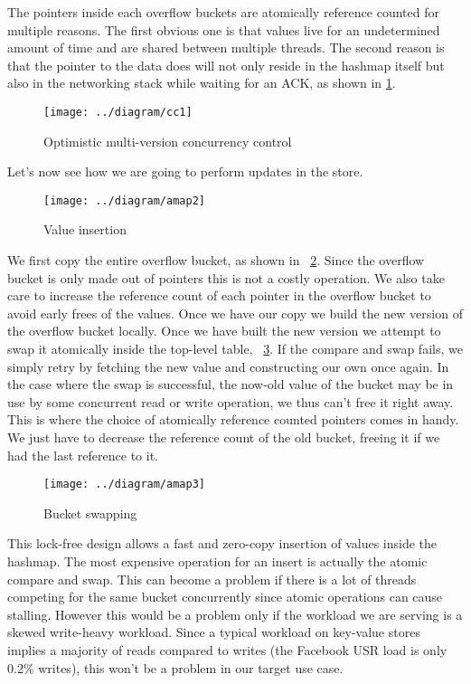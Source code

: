 \documentclass[11pt]{article}
\begin{document}
The pointers inside each overflow buckets are atomically reference
counted for multiple reasons. The first obvious one is that values
live for an undetermined amount of time and are shared between
multiple threads. The second reason is that the pointer to the data
does will not only reside in the hashmap itself but also in the
networking stack while waiting for an ACK, as shown in
\ref{fig:omvcc}.

\begin{figure}[h!]
  \texttt{[image: ../diagram/cc1]}
  \caption{Optimistic multi-version concurrency control}
  \label{fig:omvcc}
\end{figure}

Let's now see how we are going to perform updates in the store.

\begin{figure}[h!]
  \texttt{[image: ../diagram/amap2]}
  \caption{Value insertion}
  \label{fig:omvcc-insert}
\end{figure}

We first copy the entire overflow bucket, as shown in
~\ref{fig:omvcc-insert}. Since the overflow bucket is only made out of
pointers this is not a costly operation. We also take care to increase
the reference count of each pointer in the overflow bucket to avoid
early frees of the values. Once we have our copy we build the new
version of the overflow bucket locally. Once we have built the new
version we attempt to swap it atomically inside the top-level
table, ~\ref{fig:omvcc-swap}. If the compare and swap fails, we simply
retry by fetching the new value and constructing our own once
again. In the case where the swap is successful, the now-old value of
the bucket may be in use by some concurrent read or write operation,
we thus can't free it right away. This is where the choice of
atomically reference counted pointers comes in handy. We just have to
decrease the reference count of the old bucket, freeing it if we had
the last reference to it.

\begin{figure}
  \texttt{[image: ../diagram/amap3]}
  \caption{Bucket swapping}
  \label{fig:omvcc-swap}
\end{figure}

This lock-free design allows a fast and zero-copy insertion of values
inside the hashmap. The most expensive operation for an insert is
actually the atomic compare and swap. This can become a problem if
there is a lot of threads competing for the same bucket concurrently
since atomic operations can cause stalling. However this would be a
problem only if the workload we are serving is a skewed write-heavy
workload. Since a typical workload on key-value stores implies a
majority of reads compared to writes (the Facebook USR load is only
0.2\% writes), this won't be a problem in our target use case.
\end{document}

